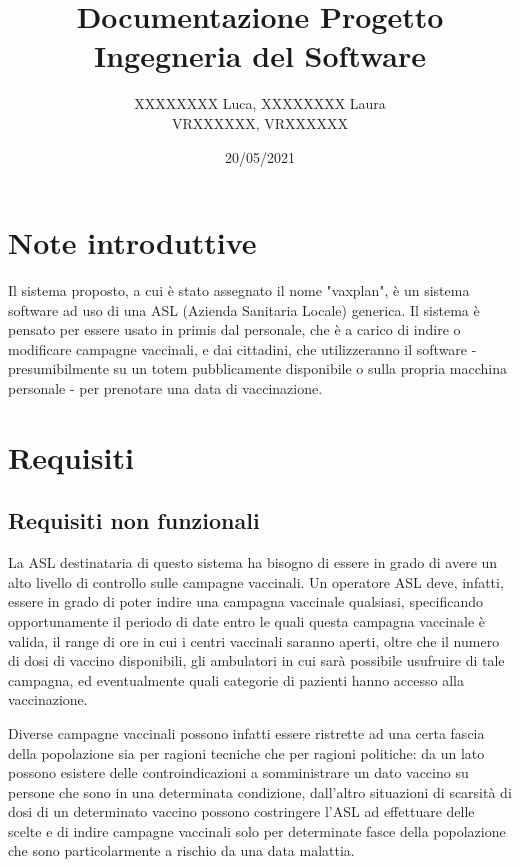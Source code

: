 \documentclass{article}
\title{Documentazione Progetto Ingegneria del Software}
\author{XXXXXXXX Luca, XXXXXXXX Laura\\
        VRXXXXXX, VRXXXXXX}
\date{20/05/2021}
\begin{document}
\maketitle

\newpage

\tableofcontents

\newpage

\section{Note introduttive}

Il sistema proposto, a cui è stato assegnato il nome "vaxplan", è un sistema software ad uso di una ASL (Azienda Sanitaria Locale) generica. Il sistema è pensato per essere usato in primis dal personale, che è a carico di indire o modificare campagne vaccinali, e dai cittadini, che utilizzeranno il software - presumibilmente su un totem pubblicamente disponibile o sulla propria macchina personale - per prenotare una data di vaccinazione.

\section{Requisiti}

\subsection{Requisiti non funzionali}

La ASL destinataria di questo sistema ha bisogno di essere in grado di avere un alto livello di controllo sulle campagne vaccinali. Un operatore ASL deve, infatti, essere in grado di poter indire una campagna vaccinale qualsiasi, specificando opportunamente il periodo di date entro le quali questa campagna vaccinale è valida, il range di ore in cui i centri vaccinali saranno aperti, oltre che il numero di dosi di vaccino disponibili, gli ambulatori in cui sarà possibile usufruire di tale campagna, ed eventualmente quali categorie di pazienti hanno accesso alla vaccinazione.

Diverse campagne vaccinali possono infatti essere ristrette ad una certa fascia della popolazione sia per ragioni tecniche che per ragioni politiche: da un lato possono esistere delle controindicazioni a somministrare un dato vaccino su persone che sono in una determinata condizione, dall'altro situazioni di scarsità di dosi di un determinato vaccino possono costringere l'ASL ad effettuare delle scelte e di indire campagne vaccinali solo per determinate fasce della popolazione che sono particolarmente a rischio da una data malattia.
\end{document}
